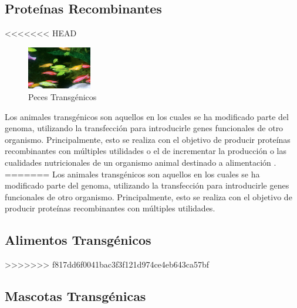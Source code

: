 \documentclass[fleqn,10pt]{SelfArx} %
\begin{document}
\subsection{Proteínas Recombinantes}

<<<<<<< HEAD
\begin{figure} %
 \begin{center}
  \includegraphics[width=0.25\textwidth]{images/danio}
  \end{center}
  \caption{Peces Transgénicos}
  \end{figure}

Los animales transgénicos son aquellos en los cuales se ha modificado parte del genoma, utilizando la transfección para introducirle genes funcionales de otro organismo. Principalmente, esto se realiza con el objetivo de producir proteínas recombinantes con múltiples utilidades o el de incrementar la producción o las cualidades nutricionales de un organismo animal destinado a alimentación \cite{Koszarycz2004}.
=======
Los animales transgénicos son aquellos en los cuales se ha modificado parte del genoma, utilizando la transfección para introducirle genes funcionales de otro organismo. Principalmente, esto se realiza con el objetivo de producir proteínas recombinantes con múltiples utilidades\cite{Koszarycz2004}.
  
\subsection{Alimentos Transgénicos}
  
>>>>>>> f817dd6f0041bac3f3f121d974ce4eb643ca57bf

\subsection{Mascotas Transgénicas}
    
\end{document}
